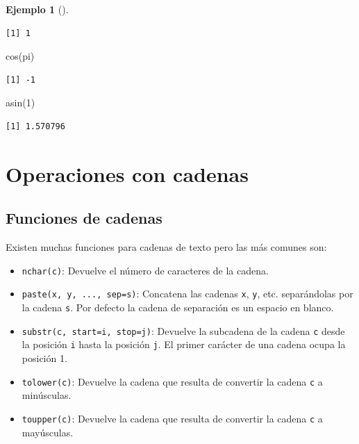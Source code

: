 \documentclass[
  spanish,
  a4paper,
]{scrreport}
\newenvironment{Shaded}{\begin{snugshade}}{\end{snugshade}}
\newcommand{\DecValTok}[1]{\textcolor[rgb]{0.68,0.00,0.00}{#1}}
\newcommand{\FunctionTok}[1]{\textcolor[rgb]{0.28,0.35,0.67}{#1}}
\newcommand{\NormalTok}[1]{\textcolor[rgb]{0.00,0.23,0.31}{#1}}
\providecommand{\tightlist}{%
  \setlength{\itemsep}{0pt}\setlength{\parskip}{0pt}}
\theoremstyle{definition}
\theoremstyle{definition}
\newtheorem{example}{Ejemplo}[chapter]
\theoremstyle{remark}
\begin{document}
\begin{example}[]
\begin{verbatim}
[1] 1
\end{verbatim}

\begin{Shaded}
\begin{Highlighting}[]
\FunctionTok{cos}\NormalTok{(pi)}
\end{Highlighting}
\end{Shaded}

\begin{verbatim}
[1] -1
\end{verbatim}

\begin{Shaded}
\begin{Highlighting}[]
\FunctionTok{asin}\NormalTok{(}\DecValTok{1}\NormalTok{)}
\end{Highlighting}
\end{Shaded}

\begin{verbatim}
[1] 1.570796
\end{verbatim}

\end{example}

\section{Operaciones con cadenas}\label{operaciones-con-cadenas}

\subsection{Funciones de cadenas}\label{funciones-de-cadenas}

Existen muchas funciones para cadenas de texto pero las más comunes son:

\begin{itemize}
\tightlist
\item
  \texttt{nchar(c)}: Devuelve el número de caracteres de la cadena.
\item
  \texttt{paste(x,\ y,\ ...,\ sep=s)}: Concatena las cadenas \texttt{x},
  \texttt{y}, etc. separándolas por la cadena \texttt{s}. Por defecto la
  cadena de separación es un espacio en blanco.
\item
  \texttt{substr(c,\ start=i,\ stop=j)}: Devuelve la subcadena de la
  cadena \texttt{c} desde la posición \texttt{i} hasta la posición
  \texttt{j}. El primer carácter de una cadena ocupa la posición 1.
\item
  \texttt{tolower(c)}: Devuelve la cadena que resulta de convertir la
  cadena \texttt{c} a minúsculas.
\item
  \texttt{toupper(c)}: Devuelve la cadena que resulta de convertir la
  cadena \texttt{c} a mayúsculas.
\end{itemize}
\end{document}
